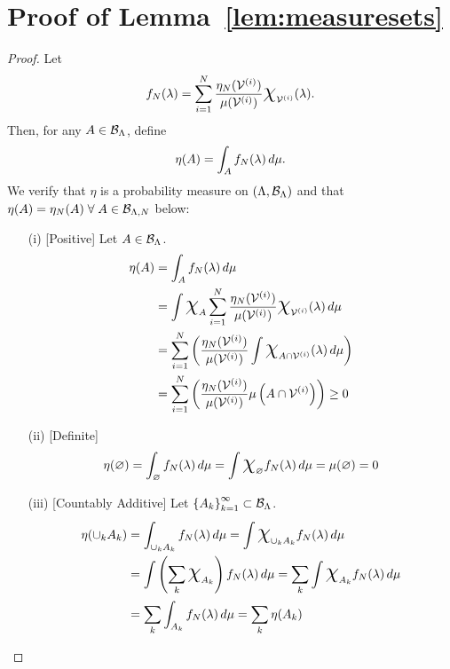 \section{Proof of Lemma~\ref{lem:measuresets}}\label{app:measuresets}
\begin{proof}
Let
\begin{equation}
f_\nsamps (\param) = \sum_{\iparam=1}^{\nsamps} \frac{\eta_\nsamps (\VV^{(\iparam)}) }{\mu (\VV^{(\iparam)})} \Chi_{\VV^{(\iparam)}} (\param).
\end{equation}
Then, for any $A\in\mathcal{B}_{\Lambda}$, define
\begin{equation}
\eta (A) = \int_A f_N (\lambda) \, d\mu.
\end{equation}
We verify that $\eta$ is a probability measure on $({\Lambda}, \mathcal{B}_{\Lambda})$ and that $\eta(A) = \eta_N(A) \; \forall \; A\in\mathcal{B}_{{\Lambda}, N}$ below:
\begin{itemize}
\item[(i)][Positive]
Let $A\in \mathcal{B}_{{\Lambda}}$.
\begin{equation*}
\begin{split}
\eta (A) &= \int_A f_\nsamps (\param) \, d\mu \\
&=  \int \Chi_A \sum_{\iparam=1}^{\nsamps} \frac{\eta_\nsamps (\VV^{(\iparam)}) }{\mu (\VV^{(\iparam)})} \Chi_{\VV^{(\iparam)}} (\param) \, d\mu \\
&= \sum_{\iparam=1}^{\nsamps} \left ( \frac{\eta_\nsamps (\VV^{(\iparam)}) }{\mu (\VV^{(\iparam)})} \int \Chi_{A\cap\VV^{(\iparam)}} (\param) \, d\mu \right ) \\
&= \sum_{\iparam=1}^{\nsamps} \left ( \frac{\eta_\nsamps (\VV^{(\iparam)}) }{\mu (\VV^{(\iparam)})} \mu\left (A\cap\VV^{(\iparam)}\right ) \right ) \geq 0
\end{split}
\end{equation*}

\item[(ii)][Definite]
\begin{equation*}
\eta (\nullset) = \int_\nullset f_\nsamps (\param) \, d\mu =\int \Chi_\nullset f_\nsamps (\param) \, d\mu = \mu(\nullset) = 0
\end{equation*}

\item[(iii)][Countably Additive]
Let $\left\{A_k\right\}_{k=1}^{\infty} \subset \mathcal{B}_{{\Lambda}}$.
\begin{equation*}
\begin{split}
\eta (\cup_k A_k) &= \int_{\cup_k A_k} f_\nsamps (\param) \, d\mu
= \int \Chi_{\cup_k A_k} f_\nsamps (\param) \, d\mu \\
&= \int \left( \sum_k \Chi_{A_k} \right ) f_\nsamps (\param) \, d\mu
=   \sum_k \int \Chi_{A_k} f_\nsamps (\param) \, d\mu \\
&=   \sum_k \int_{A_k} f_\nsamps (\param) \, d\mu = \sum_k \eta(A_k)
\end{split}
\end{equation*}



\end{itemize}
\end{proof}
